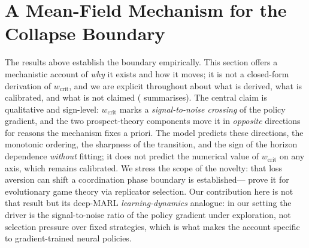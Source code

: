 \documentclass[11pt]{article}
\newcommand{\wcrit}{w_{\mathrm{crit}}}
\begin{document}
\section{A Mean-Field Mechanism for the Collapse Boundary}
\label{sec:meanfield}

The results above establish the boundary empirically. This section offers a
mechanistic account of \emph{why} it exists and how it moves; it is not a
closed-form derivation of $\wcrit$, and we are explicit throughout about
what is derived, what is calibrated, and what is not claimed
( summarises). The central claim is qualitative and
sign-level: $\wcrit$ marks a \emph{signal-to-noise crossing} of the policy
gradient, and the two prospect-theory components move it in \emph{opposite}
directions for reasons the mechanism fixes a priori. The model predicts
these directions, the monotonic ordering, the sharpness of the transition,
and the sign of the horizon dependence \emph{without} fitting; it does not
predict the numerical value of $\wcrit$ on any axis, which remains
calibrated. We stress the scope of the novelty: that loss aversion can
shift a coordination phase boundary is established---\citet{mengesha2025}
prove it for evolutionary game theory via replicator selection. Our
contribution here is not that result but its deep-MARL \emph{learning-dynamics}
analogue: in our setting the driver is the signal-to-noise ratio of the
policy gradient under exploration, not selection pressure over fixed
strategies, which is what makes the account specific to gradient-trained
neural policies.
\end{document}
